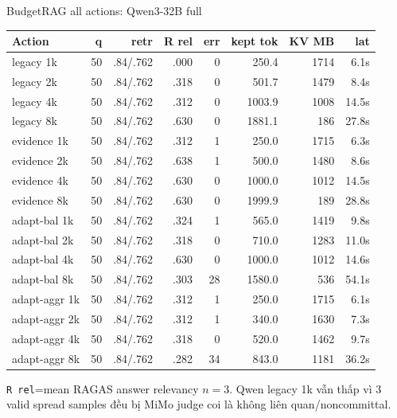 \documentclass[aspectratio=169,10pt]{beamer}
\newcommand{\smallcode}[1]{\texttt{\scriptsize #1}}
\newcommand{\takeaway}[1]{%
  \vspace{0.46em}
  \noindent\colorbox{Soft}{%
    \parbox{\dimexpr\linewidth-2\fboxsep}{\color{Ink}\strut #1\strut}%
  }%
}
\begin{document}
\begin{frame}{BudgetRAG all actions: Qwen3-32B full}
  \tiny
  \setlength{\tabcolsep}{2.6pt}
  \renewcommand{\arraystretch}{1.06}
  \begin{tabular}{>{\raggedright\arraybackslash}p{}r r r r r r r}
    \toprule
    Action & q & retr & R rel & err & kept tok & KV MB & lat \\
    \midrule
    legacy 1k & 50 & .84/.762 & .000 & 0 & 250.4 & 1714 & 6.1s \\
    legacy 2k & 50 & .84/.762 & .318 & 0 & 501.7 & 1479 & 8.4s \\
    legacy 4k & 50 & .84/.762 & .312 & 0 & 1003.9 & 1008 & 14.5s \\
    legacy 8k & 50 & .84/.762 & .630 & 0 & 1881.1 & 186 & 27.8s \\
    evidence 1k & 50 & .84/.762 & .312 & 1 & 250.0 & 1715 & 6.3s \\
    evidence 2k & 50 & .84/.762 & .638 & 1 & 500.0 & 1480 & 8.6s \\
    evidence 4k & 50 & .84/.762 & .630 & 0 & 1000.0 & 1012 & 14.5s \\
    evidence 8k & 50 & .84/.762 & .630 & 0 & 1999.9 & 189 & 28.8s \\
    adapt-bal 1k & 50 & .84/.762 & .324 & 1 & 565.0 & 1419 & 9.8s \\
    adapt-bal 2k & 50 & .84/.762 & .318 & 0 & 710.0 & 1283 & 11.0s \\
    adapt-bal 4k & 50 & .84/.762 & .630 & 0 & 1000.0 & 1012 & 14.6s \\
    adapt-bal 8k & 50 & .84/.762 & .303 & 28 & 1580.0 & 536 & 54.1s \\
    adapt-aggr 1k & 50 & .84/.762 & .312 & 1 & 250.0 & 1715 & 6.1s \\
    adapt-aggr 2k & 50 & .84/.762 & .312 & 1 & 340.0 & 1630 & 7.3s \\
    adapt-aggr 4k & 50 & .84/.762 & .318 & 0 & 520.0 & 1462 & 9.7s \\
    adapt-aggr 8k & 50 & .84/.762 & .282 & 34 & 843.0 & 1181 & 36.2s \\
    \bottomrule
  \end{tabular}
  \vspace{0.16cm}
  \takeaway{\scriptsize \smallcode{R rel}=mean RAGAS answer relevancy \(n=3\). Qwen legacy 1k vẫn thấp vì 3 valid spread samples đều bị MiMo judge coi là không liên quan/noncommittal.}
\end{frame}
\end{document}
